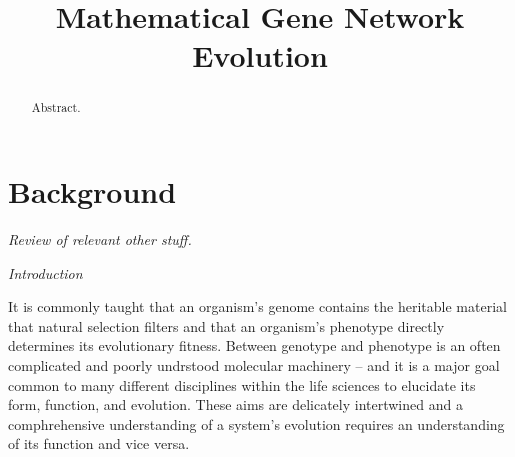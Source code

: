 \documentclass[11 pt]{article}
\newcommand{\plr}[1]{{\color{blue}\it #1}}
\newcommand{\jss}[1]{{\color{olive}\it #1}}
\newcommand{\unobservable}{\bar{\mathcal{O}}}
\begin{document}

% 
% 
% 
% 
% 
% 
%
% 
%
%
%
% 
%
%
% 

% 
\title{Mathematical Gene Network Evolution}
\maketitle

\begin{abstract}
Abstract.
\end{abstract}

\section{Background}

\plr{Review of relevant other stuff.}

\jss{Introduction}

It is commonly taught that an organism's genome contains the heritable material 
that natural selection filters and that an organism's phenotype directly determines its
evolutionary fitness. Between genotype and phenotype is an often complicated and poorly
undrstood molecular machinery -- and it is a major goal common to many different disciplines
within the life sciences to elucidate its form, function, and evolution. These aims are
delicately intertwined and a comphrehensive understanding of a system's evolution requires
an understanding of its function and vice versa.
\end{document}
